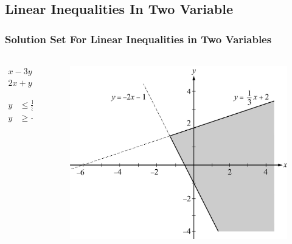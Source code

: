 \documentclass[
	11pt, %
]{beamer}
\begin{document}
\subsection{Linear Inequalities In Two Variable}


	\begin{frame}
	\frametitle{Solution Set For Linear Inequalities in Two Variables}
	\framesubtitle{}
	\begin{columns}[t] 
		\begin{column}{0.3\textwidth} %
		\begin{equation*}
			\begin{aligned}
				x - 3y &\geq -6 \\
				2x + y &=\geq -1
			\end{aligned}
		\end{equation*}

		\bigskip
		\begin{equation*}
			\begin{aligned}
				y &\leq \frac{1}{3} + 2\\
				y &\geq -2x + 1
			\end{aligned}
		\end{equation*}

		\end{column}
		\begin{column}{0.7\textwidth} %
			\begin{figure}
				\includegraphics[width=0.8\linewidth]{Linear_Inequalities_In_Two_Variable.jpg} 
			\end{figure}
    \end{column}
	\end{columns}	
\end{frame}
\end{document}
